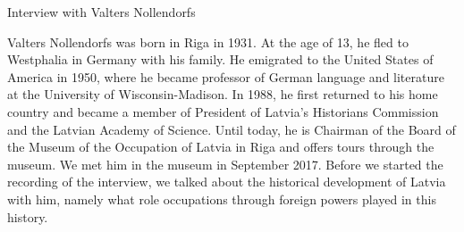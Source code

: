 Interview with Valters Nollendorfs

Valters Nollendorfs was born in Riga in 1931. At the age of 13, he fled to Westphalia in Germany with his family. He emigrated to the United States of America in 1950, where he became professor of German language and literature at the University of Wisconsin-Madison. In 1988, he first returned to his home country and became a member of President of Latvia's Historians Commission and the Latvian Academy of Science. Until today, he is Chairman of the Board of the Museum of the Occupation of Latvia in Riga and offers tours through the museum. We met him in the museum in September 2017. Before we started the recording of the interview, we talked about the historical development of Latvia with him, namely what role occupations through foreign powers played in this history.

